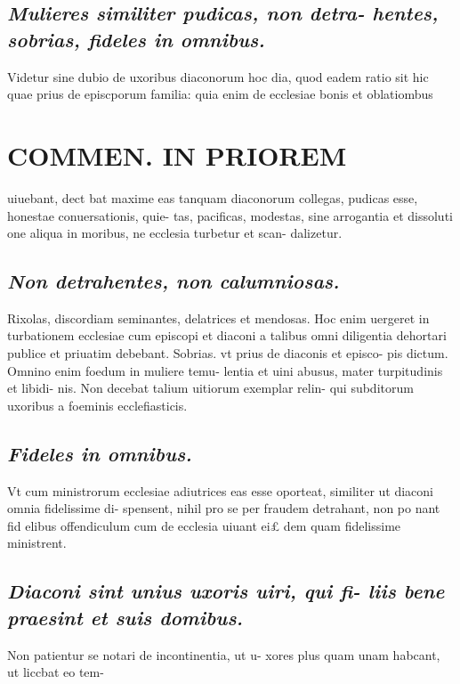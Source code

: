 \documentclass{article}
\begin{document}
\begin{pages}
\subsection*{\textit{Mulieres similiter pudicas, non detra- hentes, sobrias, fideles in omnibus. }}\pstart Videtur sine dubio de uxoribus diaconorum hoc dia, quod eadem ratio sit hic quae prius de episcporum familia: quia enim de ecclesiae bonis et oblatiombus  \pend
\section*{COMMEN. IN PRIOREM }
\marginpar{[ p.84 ]}\pstart uiuebant, dect bat maxime eas tanquam diaconorum collegas, pudicas esse, honestae conuersationis, quie- tas, pacificas, modestas, sine arrogantia et dissoluti one aliqua in moribus, ne ecclesia turbetur et scan- dalizetur.  \pend
{}
{}
\subsection*{\textit{Non detrahentes, non calumniosas. }}\pstart Rixolas, discordiam seminantes, delatrices et mendosas. Hoc enim uergeret in turbationem ecclesiae cum episcopi et diaconi a talibus omni diligentia dehortari publice et priuatim debebant.  \pend\pstart Sobrias. vt prius de diaconis et episco- pis dictum. Omnino enim foedum in muliere temu- lentia et uini abusus, mater turpitudinis et libidi- nis. Non decebat talium uitiorum exemplar relin- qui subditorum uxoribus a foeminis ecclefiasticis.  \pend
{}
{}
\subsection*{\textit{Fideles in omnibus. }}\pstart Vt cum ministrorum ecclesiae adiutrices eas esse oporteat, similiter ut diaconi omnia fidelissime di- spensent, nihil pro se per fraudem detrahant, non po nant fid elibus offendiculum cum de ecclesia uiuant ei£ dem quam fidelissime ministrent.  \pend
{}
{}
\subsection*{\textit{Diaconi sint unius uxoris uiri, qui fi- liis bene praesint et suis domibus. }}\pstart Non patientur se notari de incontinentia, ut u- xores plus quam unam habcant, ut liccbat eo tem-  \pend

\end{pages}
\end{document}
